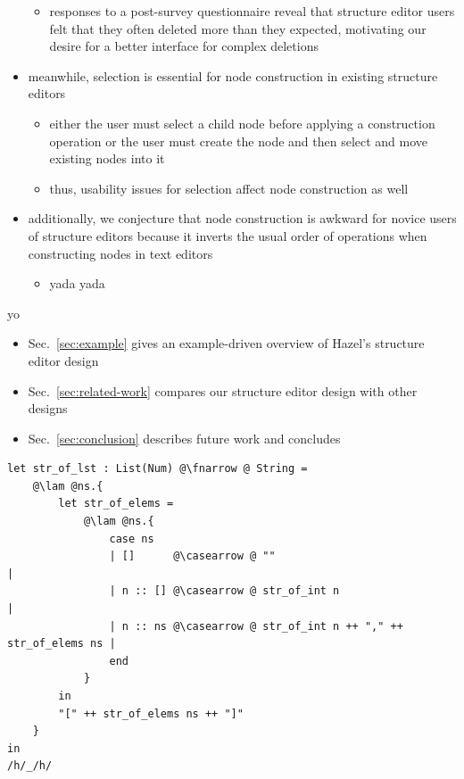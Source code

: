 \documentclass[runningheads]{llncs}
\begin{document}
\begin{itemize}
		\begin{itemize}
			\item responses to a post-survey questionnaire reveal that structure editor users felt that they often deleted more than they expected, motivating our desire for a better interface for complex deletions
		\end{itemize}
	\item meanwhile, selection is essential for node construction in existing structure editors
		\begin{itemize}
			\item either the user must select a child node before applying a construction operation or the user must create the node and then select and move existing nodes into it
			\item thus, usability issues for selection affect node construction as well
		\end{itemize}
	\item additionally, we conjecture that node construction is awkward for novice users of structure editors because it inverts the usual order of operations when constructing nodes in text editors
		\begin{itemize}
			\item yada yada 
		\end{itemize}
\end{itemize}

 yo
\begin{itemize}
\item Sec.~\ref{sec:example} gives an example-driven overview of Hazel's structure editor design
\item Sec.~\ref{sec:related-work} compares our structure editor design with other designs
\item Sec.~\ref{sec:conclusion} describes future work and concludes
\end{itemize}

\newpage
\setlength{\fboxsep}{0pt}
\begin{minipage}{\linewidth}
\begin{lstlisting}
let str_of_lst : List(Num) @\fnarrow @ String =
	@\lam @ns.{
		let str_of_elems = 
			@\lam @ns.{
				case ns
				| []      @\casearrow @ ""                                     |
				| n :: [] @\casearrow @ str_of_int n                           |
				| n :: ns @\casearrow @ str_of_int n ++ "," ++ str_of_elems ns |
				end
			} 
		in
		"[" ++ str_of_elems ns ++ "]"
	}
in
/h/_/h/
\end{lstlisting}
\end{minipage}
\end{document}
